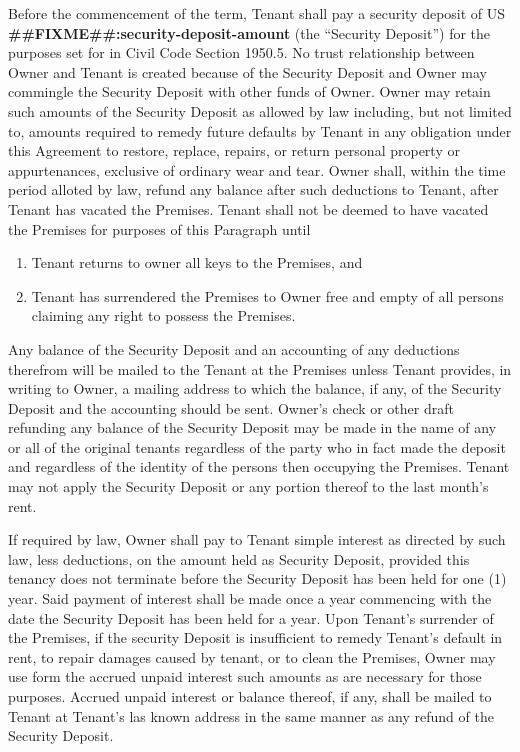 \documentclass[8pt, letterpaper, oneside]{extarticle}
\newcounter{para}
\newcommand\numparagraph{\par\refstepcounter{para}\textbf{\thepara}\hspace{5mm}}
\begin{document}
 \numparagraph{\textbf{SECURITY DEPOSIT:}\hspace{2mm}} Before the commencement of the term, Tenant shall pay a security deposit of US \textbf{\#\#FIXME\#\#:security-deposit-amount} (the ``Security Deposit'') for the purposes set for in Civil Code Section 1950.5. No trust relationship between Owner and Tenant is created because of the Security Deposit and Owner may commingle the Security Deposit with other funds of Owner. Owner may retain such amounts of the Security Deposit as allowed by law including, but not limited to, amounts required to remedy future defaults by Tenant in any obligation under this Agreement to restore, replace, repairs, or return personal property or appurtenances, exclusive of ordinary wear and tear. Owner shall, within the time period alloted by law, refund any balance after such deductions to Tenant, after Tenant has vacated the Premises. Tenant shall not be deemed to have vacated the Premises for purposes of this Paragraph until
  \begin{enumerate}
   \item Tenant returns to owner all keys to the Premises, and
   \item Tenant has surrendered the Premises to Owner free and empty of all persons claiming any right to possess the Premises.
   \end{enumerate}
 Any balance of the Security Deposit and an accounting of any deductions therefrom will be mailed to the Tenant at the Premises unless Tenant provides, in writing to Owner, a mailing address to which the balance, if any, of the Security Deposit and the accounting should be sent. Owner's check or other draft refunding any balance of the Security Deposit may be made in the name of any or all of the original tenants regardless of the party who in fact made the deposit and regardless of the identity of the persons then occupying the Premises. Tenant may not apply the Security Deposit or any portion thereof to the last month's rent.

 If required by law, Owner shall pay to Tenant simple interest as directed by such law, less deductions, on the amount held as Security Deposit, provided this tenancy does not terminate before the Security Deposit has been held for one (1) year. Said payment of interest shall be made once a year commencing with the date the Security Deposit has been held for a year. Upon Tenant's surrender of the Premises, if the security Deposit is insufficient to remedy Tenant's default in rent, to repair damages caused by tenant, or to clean the Premises, Owner may use form the accrued unpaid interest such amounts as are necessary for those purposes. Accrued unpaid interest or balance thereof, if any, shall be mailed to Tenant at Tenant's las known address in the same manner as any refund of the Security Deposit.
\end{document}
